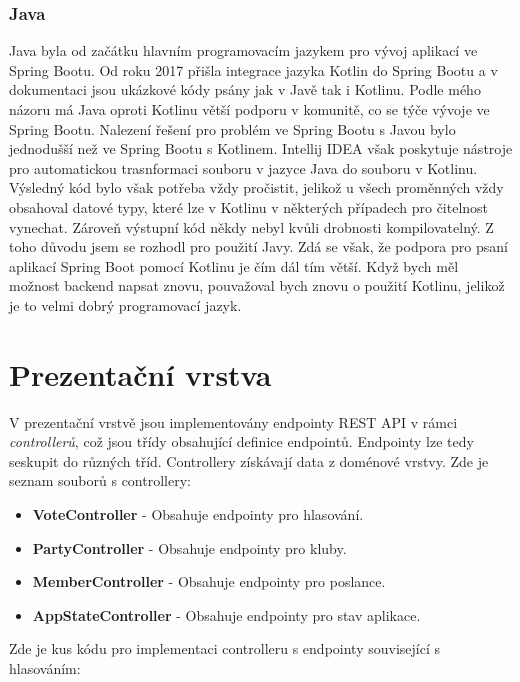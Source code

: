 \subsubsection*{Java}
Java byla od začátku hlavním programovacím jazykem pro vývoj aplikací ve Spring Bootu. Od roku 2017 přišla integrace jazyka Kotlin do Spring Bootu \cite{kotlin-support} a v dokumentaci jsou ukázkové kódy psány jak v Javě tak i Kotlinu. Podle mého názoru má Java oproti Kotlinu větší podporu v komunitě, co se týče vývoje ve Spring Bootu. Nalezení řešení pro problém ve Spring Bootu \linebreak s Javou bylo jednodušší než ve Spring Bootu s Kotlinem. Intellij IDEA však poskytuje nástroje pro automatickou trasnformaci souboru v jazyce Java do souboru v Kotlinu. Výsledný kód bylo však potřeba vždy pročistit, jelikož u všech proměnných vždy obsahoval datové typy, které lze \linebreak v Kotlinu v některých případech pro čitelnost vynechat. Zároveň výstupní kód někdy nebyl kvůli drobnosti kompilovatelný. Z toho důvodu jsem se rozhodl pro použití Javy. Zdá se však, že podpora pro psaní aplikací Spring Boot pomocí Kotlinu je čím dál tím větší. Když bych měl možnost backend napsat znovu, pouvažoval bych znovu o použití Kotlinu, jelikož je to velmi dobrý programovací jazyk.

\section {Prezentační vrstva}
V prezentační vrstvě jsou implementovány endpointy REST API v rámci \textit{controllerů}, což jsou třídy obsahující definice endpointů. Endpointy lze tedy seskupit do různých tříd. Controllery získávají data z doménové vrstvy. Zde je seznam souborů s controllery:

\begin{itemize}
	\item \textbf{VoteController} - Obsahuje endpointy pro hlasování.
	\item \textbf{PartyController} - Obsahuje endpointy pro kluby.
	\item \textbf{MemberController} - Obsahuje endpointy pro poslance.
	\item \textbf{AppStateController} - Obsahuje endpointy pro stav aplikace.
\end{itemize}

\noindent Zde je kus kódu pro implementaci controlleru s endpointy související s hlasováním:

\newpage

